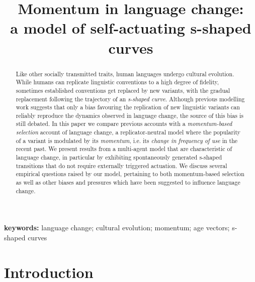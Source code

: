 \documentclass[10pt]{article}
\title{Momentum in language change:\\a model of self-actuating s-shaped curves}
\author{}
\begin{document}
\maketitle

\begin{abstract}
Like other socially transmitted traits, human languages undergo cultural evolution. While humans can replicate linguistic conventions to a high degree of fidelity, sometimes established conventions get replaced by new variants, with the gradual replacement following the trajectory of an \emph{s-shaped curve}. Although previous modelling work suggests that only a bias favouring the replication of new linguistic variants can reliably reproduce the dynamics observed in language change, the source of this bias is still debated. In this paper we compare previous accounts with a \emph{momentum-based selection} account of language change, a replicator-neutral model where the popularity of a variant is modulated by its \emph{momentum}, i.e. its \emph{change in frequency of use} in the recent past. We present results from a multi-agent model that are characteristic of language change, in particular by exhibiting spontaneously generated s-shaped transitions that do not require externally triggered actuation. We discuss several empirical questions raised by our model, pertaining to both momentum-based selection as well as other biases and pressures which have been suggested to influence language change.
\end{abstract}

\textbf{keywords:} language change; cultural evolution; momentum; age vectors; s-shaped curves

\newpage

\RaggedRight

\section{Introduction}
\end{document}
